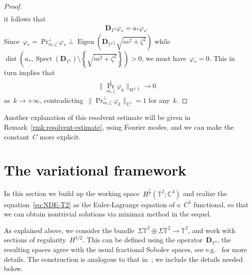 \documentclass[10pt,a4paper]{amsart}
\newcommand{\C}{\mathbb{C}}
\newcommand{\T}{\mathbb{T}}
\newcommand{\pD}{\mathbf{D}}
\newcommand{\braces}[1]{\left\{#1\right\}} %
\DeclareMathOperator{\dist}{dist}
\DeclareMathOperator{\Eigen}{Eigen}
\DeclareMathOperator{\proj}{Pr}
\DeclareMathOperator{\Spect}{Spect}
\begin{document}
\begin{proof}
\begin{align}
        \end{align}
        it follows that
        \begin{align}
            \pD_{\T^2}\varphi_*=a_*\varphi_*.
        \end{align}
        Since~$\varphi_* =\proj_{m,\zeta}^\perp\varphi_*\perp \Eigen(\pD_{\T^2};\sqrt{m^2+\zeta^2})$ while~$\dist(a_*, \Spect(\pD_{\T^2})\setminus\braces{\sqrt{m^2+\zeta^2}})>0$, we must have~$\varphi_*=0$.
        This in turn implies that
        \begin{align}
            \|\proj_{m,\zeta}^\perp \varphi_k\|_{W^{1,\frac{4}{3}}} \to 0
        \end{align}
        as~$k\to+\infty$, contradicting~$\|\proj_{m,\zeta}^\perp\varphi_k\|_{L^4}=1$ for any~$k$.
\end{proof}

Another explanation of this resolvent estimate will be given in Remark~\ref{rmk:resolvent-estimate}, using Fourier modes, and we can make the constant~$C$ more explicit. 



\section{The variational framework}\label{sect:variational framework}

In this section we build up the working space~$H^{\frac{1}{2}}(\T^2;\C^4)$ and realize the equation~\eqref{eq:NDE-T2} as the Euler-Lagrange equation of a~$C^1$ functional, so that we can obtain nontrivial solutions via minimax method in the sequel. 

As explained above, we consider the bundle~$\Sigma\T^2\oplus\Sigma\T^2\to\T^2$, and work with sections of regularity~$H^{1/2}$.  
This can be defined using the operator~$\pD_{\T^2}$, the resulting spaces agree with the usual fractional Sobolev spaces, see e.g.~\cite{Ammann2003Habil, SireXu2023variational} for more details. 
The construction is analogous to that in~\cite{WZ2026Stationary}; we include the details needed below.  
\end{document}
